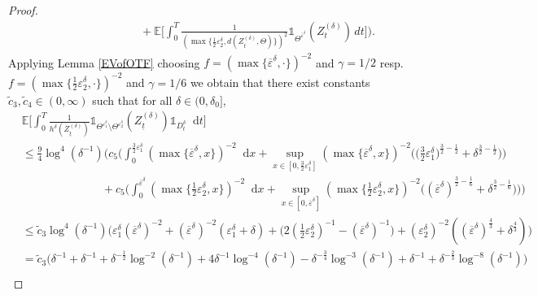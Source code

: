 \documentclass[11pt,a4paper]{article}
\numberwithin{equation}{section}
\theoremstyle{definition}
\newcommand{\E}{{\mathbb{E}}}
\newcommand{\diff}{\mathop{}\!\mathrm{d}}
\begin{document}
\begin{proof}
\begin{equation}
\begin{aligned}
             &\quad\quad\quad\quad \quad\quad\quad +  \E\Big[\int_0^T\frac{1}{(\max\{ \frac{1}{2}\varepsilon_2^{\delta} ,d(Z^{(\delta)}_{t}, \Theta)\})^2} \mathds{1}_{ \Theta^{\bar \varepsilon^{\delta}}}(Z^{(\delta)}_{t})\,dt\Bigr]\Big).
        \end{aligned}
    \end{equation}  
    Applying Lemma \ref{EVofOTF} choosing $f=(\max\{\overline\varepsilon^\delta,\cdot\})^{-2}$ and $\gamma=1/2$ resp.~$f=(\max\{\tfrac{1}{2}\varepsilon_2^{\delta},\cdot\})^{-2}$ and $\gamma=1/6$ we obtain that there exist constants $\widetilde c_3, \widetilde c_4 \in (0,\infty)$ such that for all $\delta\in(0,\delta_0]$,
    \begin{equation}\label{eq:Cost10}
        \begin{aligned}
            &\E\Big[ \int_0^T  \frac{1}{h^\delta(Z^{(\delta)}_{\underline t})} \mathds{1}_{\Theta^{\varepsilon_1^\delta}\setminus\Theta^{\varepsilon_2^\delta} }(Z^{(\delta)}_{\underline t})\mathds{1}_{D_t^{\delta}} \diff t\Big]\\
            &\leq \frac{9}{4} \log^4(\delta^{-1}) \Big( c_5 \Big(\int_0^{\frac{3}{2}\varepsilon_1^{\delta}} (\max\{\overline\varepsilon^\delta,x\})^{-2} \diff x + \sup_{x\in[0,\frac{3}{2}\varepsilon_1^{\delta} ]} (\max\{\overline\varepsilon^\delta,x\})^{-2} \Big(\Big(\frac{3}{2}\varepsilon_1^{\delta}\Big)^{\frac{3}{2}-\frac{1}{2}} + \delta^{\frac{3}{2}- \frac{1}{2}}\Big) \Big)\\
            &\quad\quad\quad\quad \quad\quad\quad +   c_5 \Big(\int_0^{\overline\varepsilon^\delta} (\max\{\tfrac{1}{2}\varepsilon_2^{\delta},x\})^{-2} \diff x + \sup_{x\in[0,\overline\varepsilon^\delta ]} (\max\{\tfrac{1}{2}\varepsilon_2^{\delta},x\})^{-2} \Big((\overline\varepsilon^\delta)^{\frac{3}{2}-\frac{1}{6}} + \delta^{\frac{3}{2}- \frac{1}{6}}\Big) \Big) \Big)\\
            &\leq \widetilde c_3 \log^4(\delta^{-1}) \Big(\varepsilon_1^{\delta}(\overline\varepsilon^\delta)^{-2} + (\overline\varepsilon^\delta)^{-2}(  \varepsilon_1^{\delta} +\delta) + \big( 2(\tfrac{1}{2} \varepsilon_2^{\delta})^{-1} - (\overline\varepsilon^\delta)^{-1} \big)  + (\varepsilon_2^{\delta})^{-2}( (\overline\varepsilon^\delta)^\frac{4}{3} + \delta^\frac{4}{3})\Big)\\
            &= \widetilde c_3 \big( \delta^{-1} + \delta^{-1} + \delta^{-\frac{1}{2}}\log^{-2}(\delta^{-1}) + 4 \delta^{-1}\log^{-4}(\delta^{-1}) - \delta^{-\frac{3}{4}} \log^{-3}(\delta^{-1}) + \delta^{-1} + \delta^{-\frac{2}{3}}\log^{-8}(\delta^{-1})\big)\\ 

\end{aligned}
\end{equation}
\end{proof}
\end{document}
